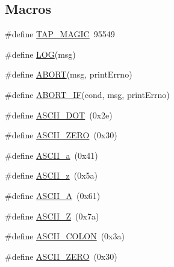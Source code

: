 \subsection*{Macros}
\begin{DoxyCompactItemize}
\item 
\#define \hyperlink{tap-creator_8cc_af9ac95d538205da6013d79a63fee2bd7}{T\+A\+P\+\_\+\+M\+A\+G\+IC}~95549
\item 
\#define \hyperlink{tap-creator_8cc_a158a8c64f24645c7478298399825737f}{L\+OG}(msg)
\item 
\#define \hyperlink{tap-creator_8cc_ac1fbabec36a484b1551c2855ce8a0514}{A\+B\+O\+RT}(msg,  print\+Errno)
\item 
\#define \hyperlink{tap-creator_8cc_a91c11c90ad2f1672fbd3c031038dce16}{A\+B\+O\+R\+T\+\_\+\+IF}(cond,  msg,  print\+Errno)
\item 
\#define \hyperlink{tap-creator_8cc_a6ec0f0cb1e0c4e317469e4103bec5fd5}{A\+S\+C\+I\+I\+\_\+\+D\+OT}~(0x2e)
\item 
\#define \hyperlink{tap-creator_8cc_abde11a6ee98560227d0d3889da0408e4}{A\+S\+C\+I\+I\+\_\+\+Z\+E\+RO}~(0x30)
\item 
\#define \hyperlink{tap-creator_8cc_acb0c7653dabe53da8a7fb03bcad505e7}{A\+S\+C\+I\+I\+\_\+a}~(0x41)
\item 
\#define \hyperlink{tap-creator_8cc_a76cb409bf2d31112b1bec0056271e3ce}{A\+S\+C\+I\+I\+\_\+z}~(0x5a)
\item 
\#define \hyperlink{tap-creator_8cc_a6ccdee41712ed103021e82cb944f47e6}{A\+S\+C\+I\+I\+\_\+A}~(0x61)
\item 
\#define \hyperlink{tap-creator_8cc_a282e9a9765b0ae5f0a4aa813c3a4932c}{A\+S\+C\+I\+I\+\_\+Z}~(0x7a)
\item 
\#define \hyperlink{tap-creator_8cc_aa13140b716dfb153353b2bf8be77d3f5}{A\+S\+C\+I\+I\+\_\+\+C\+O\+L\+ON}~(0x3a)
\item 
\#define \hyperlink{tap-creator_8cc_abde11a6ee98560227d0d3889da0408e4}{A\+S\+C\+I\+I\+\_\+\+Z\+E\+RO}~(0x30)
\end{DoxyCompactItemize}
